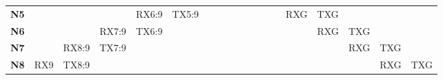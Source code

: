 \documentclass{tfgitic}[2024/07/01]
\begin{document}
{\begin{figure}
{\begin{tabular}{l||cccccccccccccccccc}
            \cline{5-7}\cline{14-16}
            \textbf{N5} &                          &                            & \multicolumn{1}{c|}{}      & \multicolumn{1}{c|}{RX6:9} & \multicolumn{1}{c|}{TX5:9} &                            &                            &                            &                            &                                                              &                                                              &                                                              & \multicolumn{1}{c|}{}                                        & \multicolumn{1}{c|}{RXG} & \multicolumn{1}{c|}{TXG} &                          &                          &                           \\ 
            \cline{4-6}\cline{15-17}
            \textbf{N6} &                          & \multicolumn{1}{c|}{}      & \multicolumn{1}{c|}{RX7:9} & \multicolumn{1}{c|}{TX6:9} &                            &                            &                            &                            &                            &                                                              &                                                              &                                                              &                                                              & \multicolumn{1}{c|}{}    & \multicolumn{1}{c|}{RXG} & \multicolumn{1}{c|}{TXG} &                          &                           \\ 
            \cline{3-5}\cline{16-18}
            \textbf{N7} & \multicolumn{1}{c|}{}    & \multicolumn{1}{c|}{RX8:9} & \multicolumn{1}{c|}{TX7:9} &                            &                            &                            &                            &                            &                            &                                                              &                                                              &                                                              &                                                              &                          & \multicolumn{1}{c|}{}    & \multicolumn{1}{c|}{RXG} & \multicolumn{1}{c|}{TXG} &                           \\ 
            \cline{2-4}\cline{17-19}
            \textbf{N8} & \multicolumn{1}{c|}{RX9} & \multicolumn{1}{c|}{TX8:9} &                            &                            &                            &                            &                            &                            &                            &                                                              &                                                              &                                                              &                                                              &                          &                          & \multicolumn{1}{c|}{}    & \multicolumn{1}{c|}{RXG} & \multicolumn{1}{c|}{TXG}  \\ 

\end{tabular}}
\end{figure}}
\end{document}
